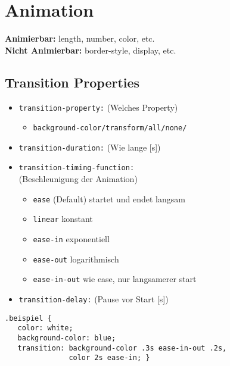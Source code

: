 
\section{Animation}

\textbf{Animierbar:} length, number, color, etc.\\
\textbf{Nicht Animierbar:} border-style, display, etc.

\subsection{Transition Properties}


\begin{itemize}
    \item \texttt{transition-property:} (Welches Property)
    \begin{itemize}
        \item \texttt{background-color/transform/all/none/}
    \end{itemize}
    \item \texttt{transition-duration:} (Wie lange [s])
    \item \texttt{transition-timing-function:}\\
    (Beschleunigung der Animation)
    \begin{itemize}
        \item \texttt{ease} (Default) startet und endet langsam
        \item \texttt{linear} konstant
        \item \texttt{ease-in} exponentiell
        \item \texttt{ease-out} logarithmisch
        \item \texttt{ease-in-out} wie ease, nur langsamerer start
    \end{itemize}
    \item \texttt{transition-delay:} (Pause vor Start [s])
\end{itemize}
\begin{lstlisting}
.beispiel {
   color: white;
   background-color: blue;
   transition: background-color .3s ease-in-out .2s,
               color 2s ease-in; }
\end{lstlisting}

